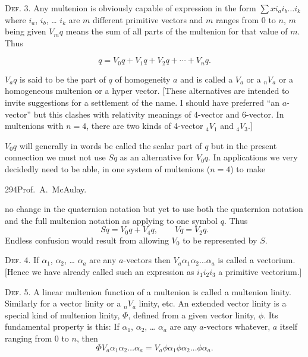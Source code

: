 \documentclass[11pt]{article}
\begin{document}
\noindent\textsc{Def. 3.} Any multenion is obviously capable of expression in
the form $\sum xi_ai_b\ldots i_k$ where $i_a$, $i_b$, \ldots{} $i_k$ are $m$
different primitive vectors and $m$ ranges from $0$ to $n$, $m$ being given
$V_mq$ means the sum of all parts of the multenion for that value of $m$. Thus

\begin{equation*}
  q=V_0q+V_1q+V_2q+\cdots+V_nq.
\end{equation*}

$V_aq$ is said to be the part of $q$ of homogeneity $a$ and is called a $V_a$
or a ${}_nV_a$ or a homogeneous multenion or a hyper vector. [These alternatives
are intended to invite suggestions for a settlement of the name. I should have
preferred ``an $a$-vector'' but this clashes with relativity meanings of
4-vector and 6-vector. In multenions with $n=4$, there are two kinds of
4-vector ${}_4V_1$ and ${}_4V_3$.]

$V_0q$ will generally in words be called the scalar part of $q$ but in the
present connection we must not use $Sq$ as an alternative for $V_0q$. In
applications we very decidedly need to be able, in one system of multenions
($n=4$) to make

\newpage
\thispagestyle{empty}
\begin{center}
  294\hfill Prof.\ A.\ McAulay.
\end{center}

no change in the quaternion notation but yet to use both the quaternion
notation and the full multenion notation as applying to one symbol $q$. Thus
\begin{equation*}
  Sq=V_0q+V_4q, \qquad Vq=V_2q.
\end{equation*}
Endless confusion would result from allowing $V_0$ to be represented by $S$.

\noindent\textsc{Def. 4.} If $\alpha_1$, $\alpha_2$, \ldots{} $\alpha_a$ are
any $a$-vectors then $V_a\alpha_1\alpha_2\ldots\alpha_a$ is called a
vectorium. [Hence we have already called such an expression as $i_1i_2i_3$ a
primitive vectorium.]

\noindent\textsc{Def. 5.} A linear multenion function of a multenion is called
a multenion linity. Similarly for a vector linity or a ${}_nV_a$ linity, etc.
An extended vector linity is a special kind of multenion linity, $\Phi$, defined
from a given vector linity, $\phi$. Its fundamental property is this: If
$\alpha_1$, $\alpha_2$, \ldots{} $\alpha_a$ are any $a$-vectors whatever, $a$
itself ranging from $0$ to $n$, then
\begin{equation}
  \Phi V_a\alpha_1\alpha_2\ldots\alpha_a
    = V_a\phi\alpha_1\phi\alpha_2\ldots\phi\alpha_a.
\tag{2}
\end{equation}
\end{document}
